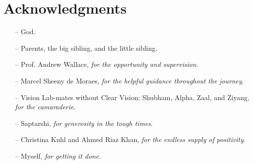 \doublespacing

\setcounter{page}{1} \pagestyle{plain}


\tableofcontents

\listoffigures
\listoftables

\chapter*{Acknowledgments}
         {\protect{}}
\begin{itemize}
\item[--] God. 
\item[--] Parents, the big sibling, and the little sibling.
\item[--] Prof. Andrew Wallace, \textit{for the opportunity and supervision}. 
\item [--] Marcel Sheeny de Moraes, \textit{for the helpful guidance throughout the journey}.
\item[--] Vision Lab-mates without Clear Vision: Shubham, Alpha, Zaal, and Ziyang, \textit{for the camaraderie}.  
\item[--] Saptarshi, \textit{for generosity in the tough times}.
\item[--] Christina Kuhl and Ahmed Riaz Khan, \textit{for the endless supply of positivity}. 
\item[--] Myself, \textit{for getting it done}.
\end{itemize}

\pagestyle{fancy}